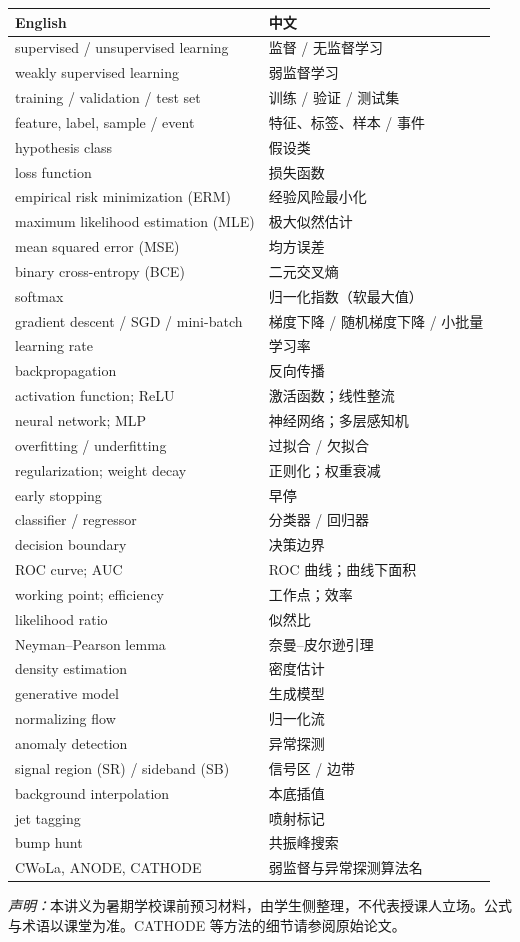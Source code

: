 \documentclass[11pt,a4paper]{article}
\theoremstyle{definition}
\theoremstyle{plain}
\theoremstyle{remark}
\begin{document}
\begin{center}
\begin{tabular}{>{\raggedright\arraybackslash}p{} p{}}
\toprule
\textbf{English} & \textbf{中文} \\
\midrule
supervised / unsupervised learning & 监督 / 无监督学习 \\
weakly supervised learning & 弱监督学习 \\
training / validation / test set & 训练 / 验证 / 测试集 \\
feature, label, sample / event & 特征、标签、样本 / 事件 \\
hypothesis class & 假设类 \\
loss function & 损失函数 \\
empirical risk minimization (ERM) & 经验风险最小化 \\
maximum likelihood estimation (MLE) & 极大似然估计 \\
mean squared error (MSE) & 均方误差 \\
binary cross-entropy (BCE) & 二元交叉熵 \\
softmax & 归一化指数（软最大值） \\
gradient descent / SGD / mini-batch & 梯度下降 / 随机梯度下降 / 小批量 \\
learning rate & 学习率 \\
backpropagation & 反向传播 \\
activation function; ReLU & 激活函数；线性整流 \\
neural network; MLP & 神经网络；多层感知机 \\
overfitting / underfitting & 过拟合 / 欠拟合 \\
regularization; weight decay & 正则化；权重衰减 \\
early stopping & 早停 \\
classifier / regressor & 分类器 / 回归器 \\
decision boundary & 决策边界 \\
ROC curve; AUC & ROC 曲线；曲线下面积 \\
working point; efficiency & 工作点；效率 \\
likelihood ratio & 似然比 \\
Neyman--Pearson lemma & 奈曼--皮尔逊引理 \\
density estimation & 密度估计 \\
generative model & 生成模型 \\
normalizing flow & 归一化流 \\
anomaly detection & 异常探测 \\
signal region (SR) / sideband (SB) & 信号区 / 边带 \\
background interpolation & 本底插值 \\
jet tagging & 喷射标记 \\
bump hunt & 共振峰搜索 \\
CWoLa, ANODE, CATHODE & 弱监督与异常探测算法名 \\
\bottomrule
\end{tabular}
\end{center}

\vspace{1.2em}
\noindent\textit{声明：}本讲义为暑期学校课前预习材料，由学生侧整理，不代表授课人立场。公式与术语以课堂为准。CATHODE 等方法的细节请参阅原始论文。
\end{document}
